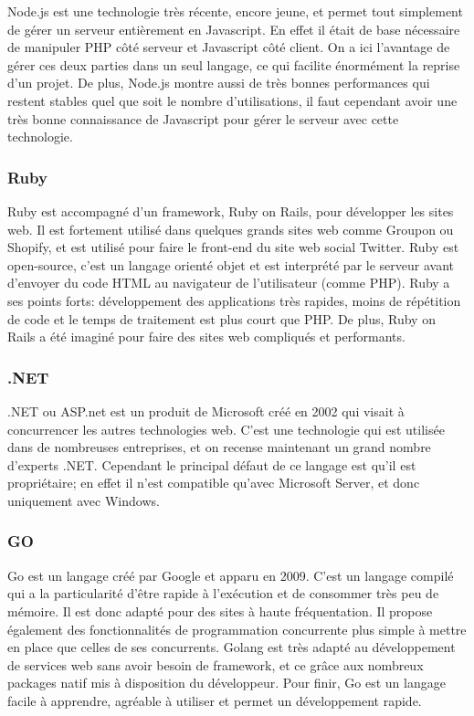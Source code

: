          Node.js est une technologie très récente, encore jeune, et permet tout simplement de gérer un serveur entièrement en Javascript.
         En effet il était de base nécessaire de manipuler PHP côté serveur et Javascript côté client. On a ici l’avantage
         de gérer ces deux parties dans un seul langage, ce qui facilite énormément la reprise d’un projet. De plus,
         Node.js montre aussi de très bonnes performances qui restent stables quel que soit le nombre d’utilisations,
         il faut cependant avoir une très bonne connaissance de Javascript pour gérer le serveur avec cette technologie.

        \subsubsection{Ruby}
        \label{subsubsec:ruby}
        Ruby est accompagné d’un framework, Ruby on Rails, pour développer les sites web. Il est fortement utilisé
        dans quelques grands sites web comme Groupon ou Shopify, et est utilisé pour faire le front-end du site web
        social Twitter. Ruby est open-source, c’est un langage orienté objet et est interprété par le serveur avant
        d’envoyer du code HTML au navigateur de l’utilisateur (comme PHP). Ruby a ses points forts: développement
        des applications très rapides, moins de répétition de code et le temps de traitement est plus court que PHP.
        De plus, Ruby on Rails a été imaginé pour faire des sites web compliqués et performants.

        \subsubsection{.NET}
        \label{subsubsec:dotnet}
        .NET ou ASP.net est un produit de Microsoft créé en 2002 qui visait à concurrencer les autres technologies web.
        C’est une technologie qui est utilisée dans de nombreuses entreprises, et on recense maintenant un grand nombre
        d’experts .NET. Cependant le principal défaut de ce langage est qu’il est propriétaire; en effet il n’est compatible
        qu’avec Microsoft Server, et donc uniquement avec Windows.

        \subsubsection{GO}
        \label{subsubsec:go}
        Go est un langage créé par Google et apparu en 2009. C’est un langage compilé qui a la particularité d’être
        rapide à l’exécution et de consommer très peu de mémoire. Il est donc adapté pour des sites à haute fréquentation.
        Il propose également des fonctionnalités de programmation concurrente plus simple à mettre en place que celles
        de ses concurrents.  Golang est très adapté au développement de services web sans avoir besoin de framework,
        et ce grâce aux nombreux packages natif mis à disposition du développeur. Pour finir, Go est un langage facile
        à apprendre, agréable à utiliser et permet un développement rapide.

